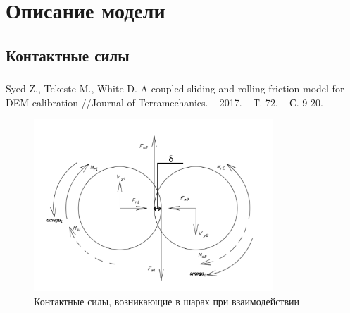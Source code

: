\documentclass[c]{beamer}  %
\begin{document}
\section{Описание модели}

\subsection{Контактные силы}




\begin{frame}
\frametitle{\insertsection} 
\framesubtitle{\insertsubsection}
Syed Z., Tekeste M., White D. A coupled sliding and rolling friction model for DEM calibration //Journal of Terramechanics. – 2017. – Т. 72. – С. 9-20.
\begin{figure}[h!]
	\centering
	\includegraphics[width=0.8\textwidth]{sily}
	\caption{Контактные силы, возникающие в шарах при взаимодействии}
\end{figure} 
\end{frame}
\end{document}
